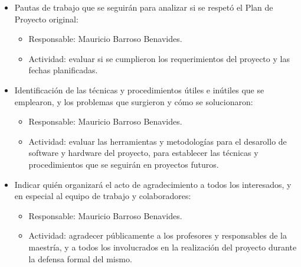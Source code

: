 \documentclass[
11pt, %
]{plan}
\begin{document}
\begin{itemize}
	\item Pautas de trabajo que se seguirán para analizar si se respetó el Plan de Proyecto original:
		\begin{itemize}
			\item Responsable: Mauricio Barroso Benavides.
			\item Actividad: evaluar si se cumplieron los requerimientos del proyecto y las fechas planificadas.
		\end{itemize}
	\item Identificación de las técnicas y procedimientos útiles e inútiles que se emplearon, y los problemas que surgieron y cómo se solucionaron:
		\begin{itemize}
			\item Responsable: Mauricio Barroso Benavides.
			\item Actividad: evaluar las herramientas y metodologías para el desarollo de software y hardware del proyecto, para establecer las técnicas y procedimientos que se seguirán en proyectos futuros.
		\end{itemize}
	\item Indicar quién organizará el acto de agradecimiento a todos los interesados, y en especial al equipo de trabajo y colaboradores:
		\begin{itemize}
			\item Responsable: Mauricio Barroso Benavides.
			\item Actividad: agradecer públicamente a los profesores y responsables de la maestría, y a todos los involucrados en la realización del proyecto durante la defensa formal del mismo.
		\end{itemize}
\end{itemize}
\end{document}
